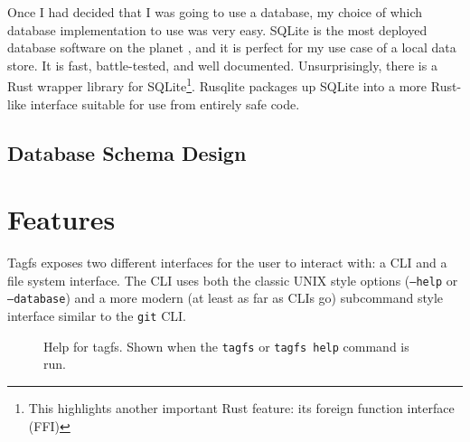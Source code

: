 Once I had decided that I was going to use a database, my choice of which
database implementation to use was very easy. SQLite is the most deployed
database software on the planet \cite{sqlite-most-used}, and it is perfect for
my use case of a local data store. It is fast, battle-tested, and well
documented. Unsurprisingly, there is a Rust wrapper library for
SQLite\footnote{This highlights another important Rust feature: its foreign
function interface (FFI)}. Rusqlite packages up SQLite into a more Rust-like
interface suitable for use from entirely safe code. 


\subsection{Database Schema Design}

\section{Features}
\label{section:features}

Tagfs exposes two different interfaces for the user to interact with: a CLI and
a file system interface. The CLI uses both the classic UNIX style options
(\texttt{--help} or \texttt{--database}) and a more modern (at least as far as
CLIs go) subcommand style interface similar to the \texttt{git} CLI.

\begin{figure}[h]
    \centering
    \caption[Help for \texttt{tagfs} CLI]{Help for tagfs. Shown when the
        \texttt{tagfs} or \texttt{tagfs help} command is run. }
    \label{fig:root-cli}
\end{figure}

